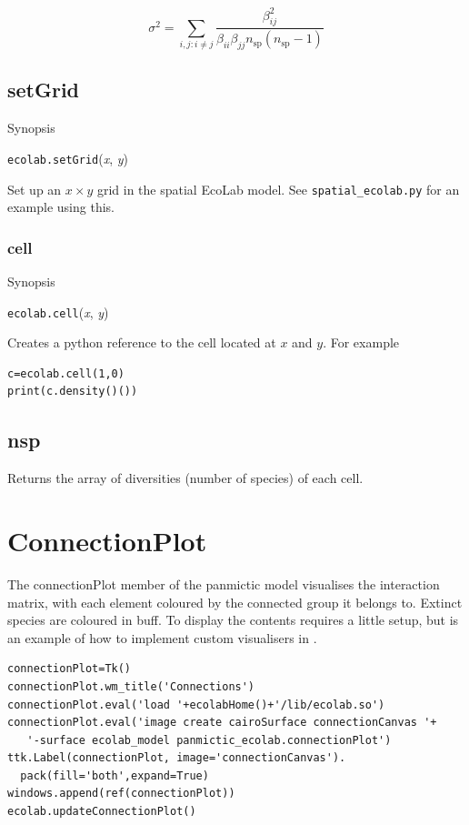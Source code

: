 \documentclass{article}
\newcommand{\EcoLab}{{\sffamily\slshape
    \mbox{\raisebox{.5ex}{Eco}\hspace{-.4em}{\makebox[.5em]{L}ab}}}}
\begin{document}
\begin{equation}
  \sigma^2=\sum_{i,j: i\ne j} \frac{\beta_{ij}^2}{\beta_{ii}\beta_{jj}n_\mathrm{sp}(n_\mathrm{sp}-1)}
\end{equation}
\subsection{setGrid}

Synopsis

{\tt ecolab.setGrid}({\em x}, {\em y})

\noindent Set up an $x\times y$ grid in the spatial EcoLab model. See
\verb+spatial_ecolab.py+ for an example using this.

\subsubsection{cell}

Synopsis

{\tt ecolab.cell}({\em x}, {\em y})

\noindent Creates a python reference to the cell located at $x$ and
$y$. For example
\begin{verbatim}
c=ecolab.cell(1,0)
print(c.density()())
\end{verbatim}

\subsection{nsp}

Returns the array of diversities (number of species) of each cell.

\section{ConnectionPlot}

The connectionPlot member of the panmictic model visualises the
interaction matrix, with each element coloured by the connected group
it belongs to. Extinct species are coloured in buff. To display the
contents requires a little setup, but is an example of how to
implement custom visualisers in \EcoLab.

\begin{verbatim}
connectionPlot=Tk()
connectionPlot.wm_title('Connections')
connectionPlot.eval('load '+ecolabHome()+'/lib/ecolab.so')
connectionPlot.eval('image create cairoSurface connectionCanvas '+
   '-surface ecolab_model panmictic_ecolab.connectionPlot')
ttk.Label(connectionPlot, image='connectionCanvas').
  pack(fill='both',expand=True)
windows.append(ref(connectionPlot))
ecolab.updateConnectionPlot()
\end{verbatim}
\end{document}
